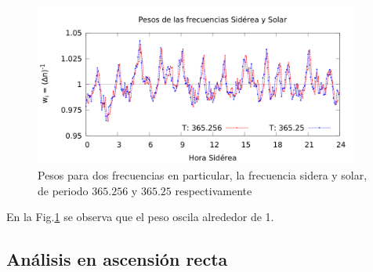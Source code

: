 	\begin{figure}[H]
		\centering
		\includegraphics[width=0.95\textwidth]{../Anisotropia/pesos_solar_siderea.png}
		\caption{Pesos para dos frecuencias en particular, la frecuencia sidera y solar, de periodo $365.256$ y $365.25$ respectivamente}
		\label{fig:pesos_ejem}
	\end{figure}

	En la Fig.\ref{fig:pesos_ejem} se observa que el peso oscila alrededor de 1.

	\subsection{Análisis en ascensión recta}
	
